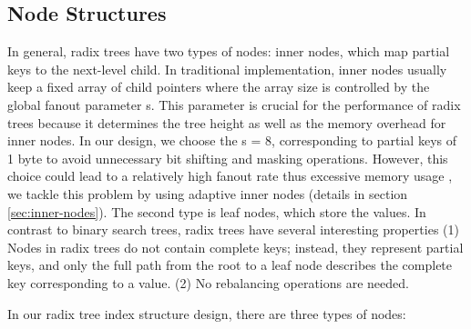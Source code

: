 \documentclass[sigplan,screen,nonacm]{acmart}
\begin{document}
\subsection{Node Structures}
In general, radix trees have two types of nodes: inner nodes, which map partial keys to the next-level child. In traditional implementation, inner nodes usually keep a fixed array of child pointers where the array size is controlled by the global fanout parameter s. This parameter is crucial for the performance of radix trees because it determines the tree height as well as the memory overhead for inner nodes. In our design, we choose the s = 8, corresponding to partial keys of 1 byte to avoid unnecessary bit shifting and masking operations. However, this choice could lead to a relatively high fanout rate thus excessive memory usage \cite{boehm2011efficient} , we tackle this problem by using adaptive inner nodes (details in section \ref{sec:inner-nodes}). The second type is leaf nodes, which store the values. In contrast to binary search trees, radix trees have several interesting properties (1) Nodes in radix trees do not contain complete keys; instead, they represent partial keys, and only the full path from the root to a leaf node describes the complete key corresponding to a value. (2) No rebalancing operations are needed. 

In our radix tree index structure design, there are three types of nodes: 
\end{document}
